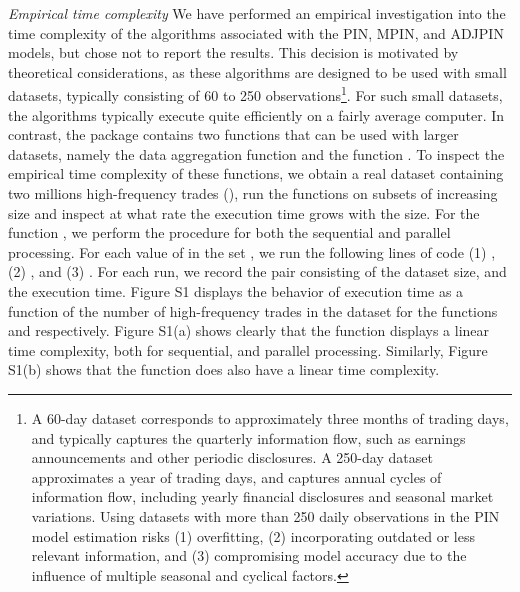 \noindent \textit{Empirical time complexity} We have performed an empirical investigation into the time complexity of the algorithms associated with the PIN, MPIN, and ADJPIN models, but chose not to report the results. This decision is motivated by theoretical considerations, as these algorithms are designed to be used with small datasets, typically consisting of 60 to 250 observations\footnote{
A 60-day dataset corresponds to approximately three months of trading days, and typically captures the quarterly information flow, such as earnings announcements and other periodic disclosures. A 250-day dataset approximates a year of trading days, and captures annual cycles of information flow, including yearly financial disclosures and seasonal market variations. Using datasets with more than 250 daily observations in the PIN model estimation risks (1) overfitting, (2) incorporating outdated or less relevant information, and (3) compromising model accuracy due to the influence of multiple seasonal and cyclical factors.}. For such small datasets, the algorithms typically execute quite efficiently on a fairly average computer. In contrast, the package contains two functions that can be used with larger datasets, namely the data aggregation function  and the function . To inspect the empirical time complexity of these functions, we obtain a real dataset containing two millions high-frequency trades (), run the functions on subsets of increasing size and inspect at what rate the execution time grows with the size. For the function , we perform the procedure for both the sequential and parallel processing. For each value of  in the set , we run the following lines of code (1) , (2) , and (3) . For each run, we record the pair consisting of the dataset size, and the execution time. Figure S1 displays the behavior of execution time as a function of the number of high-frequency trades in the dataset for the functions  and  respectively. Figure S1(a) shows clearly that the function  displays a linear time complexity, both for sequential, and parallel processing. Similarly, Figure S1(b) shows that the function   does also have a linear time complexity.
\vspace{1mm}

